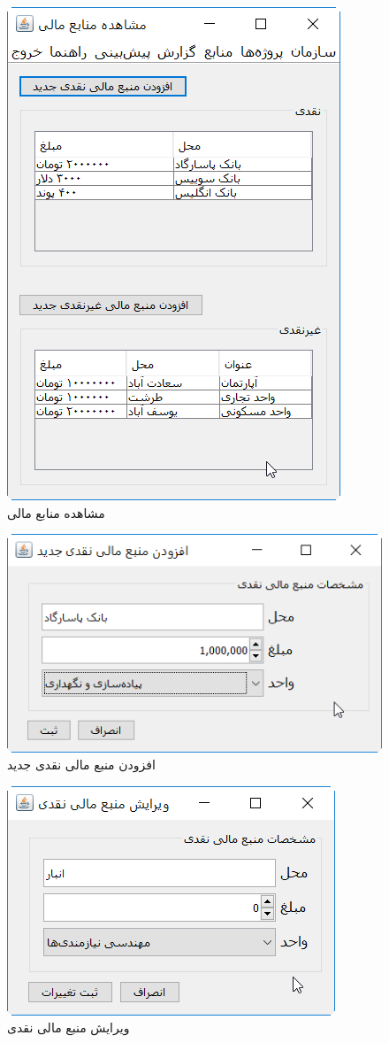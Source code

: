 \begin{figure}[H]
	\centering
	\includegraphics[scale=0.8]{img/prot/ViewFinanceResources}
	\caption{مشاهده منابع مالی}
\end{figure}
\begin{figure}[H]
	\centering
	\includegraphics[scale=0.8]{img/prot/AddNewFinanceResource_cach}
	\caption{افزودن منبع مالی نقدی جدید}
\end{figure}
\begin{figure}[H]
	\centering
	\includegraphics[scale=0.8]{img/prot/EditFinanceResource_cach}
	\caption{ویرایش منبع مالی نقدی }
\end{figure}
